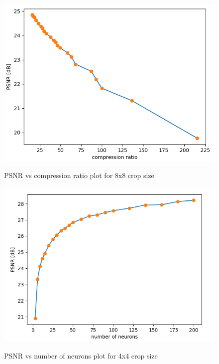 \documentclass[../IDP_Task5_Karwowski_Kowalewski.tex]{subfiles}
\begin{document}
{    \begin{figure}[!htbp]
        \centering
        \includegraphics[width=\textwidth]{img/karwowski/8x8_compression_ratio}
        \label{fig:8x8_compression_ratio}
        \caption{PSNR vs compression ratio plot for 8x8 crop size}
    \end{figure}

    \begin{figure}[!htbp]
        \centering
        \includegraphics[width=\textwidth]{img/karwowski/4x4_number_of_neurons}
        \label{fig:4x4_number_of_neurons}
        \caption{PSNR vs number of neurons plot for 4x4 crop size}
    \end{figure}
    
}
\end{document}
